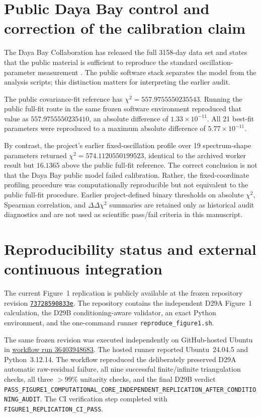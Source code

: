 \section{Public Daya Bay control and correction of the calibration claim}\label{sec:dayabay-control}

The Daya Bay Collaboration has released the full 3158-day data set and states that the public material is sufficient to reproduce the standard oscillation-parameter measurement \autocite{dayabay2023,dayabaydata2025}. The public software stack separates the model from the analysis scripts; this distinction matters for interpreting the earlier audit.

The public covariance-fit reference has $\chi^2=557.9755550235543$. Running the public full-fit route in the same frozen software environment reproduced that value as $557.9755550235410$, an absolute difference of $1.33\times10^{-11}$. All 21 best-fit parameters were reproduced to a maximum absolute difference of $5.77\times10^{-11}$.

By contrast, the project's earlier fixed-oscillation profile over 19 spectrum-shape parameters returned $\chi^2=574.1120550199523$, identical to the archived worker result but $16.1365$ above the public full-fit reference. The correct conclusion is not that the Daya Bay public model failed calibration. Rather, the fixed-coordinate profiling procedure was computationally reproducible but not equivalent to the public full-fit procedure. Earlier project-defined binary thresholds on absolute $\chi^2$, Spearman correlation, and $\Delta\Delta\chi^2$ summaries are retained only as historical audit diagnostics and are not used as scientific pass/fail criteria in this manuscript.

\section{Reproducibility status and external continuous integration}\label{sec:reproducibility}

The current Figure~1 replication is publicly available at the frozen repository revision
\href{https://github.com/yokken0907/led-neutrino-open-reproduction-audit/tree/73728590833e10c85eb2dd75bf844b825271b53d}{\texttt{73728590833e}}. The repository contains the independent D29A Figure~1 calculation, the D29B conditioning-aware validator, an exact Python environment, and the one-command runner \texttt{reproduce\_figure1.sh}.

The same frozen revision was executed independently on GitHub-hosted Ubuntu in
\href{https://github.com/yokken0907/led-neutrino-open-reproduction-audit/actions/runs/36403948683}{workflow run 36403948683}. The hosted runner reported Ubuntu~24.04.5 and Python~3.12.14. The workflow reproduced the deliberately preserved D29A automatic raw-residual failure, all nine successful finite/infinite triangulation checks, all three $>99\%$ unitarity checks, and the final D29B verdict
\texttt{PASS\_FIGURE1\_COMPUTATIONAL\_CORE\_INDEPENDENT\_REPLICATION\_AFTER\_CONDITIONING\_AUDIT}. The CI verification step completed with \texttt{FIGURE1\_REPLICATION\_CI\_PASS}.

